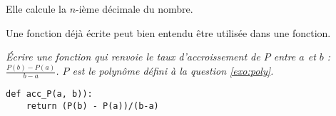 \begin{Answer}
Elle calcule la $n$-ième décimale du nombre.
\end{Answer} 
\medskip
Une fonction déjà écrite peut bien entendu être utilisée dans une fonction. 
\begin{Exercise}[title={Taux d'accroissement}, label = exo:accP]
\it Écrire une fonction  qui renvoie le taux d'accroissement de $P$ entre $a$ et $b$ : $\displaystyle \frac{P(b) -P(a)}{b-a}$. $P$ est le polynôme défini à la question \ref{exo:poly}.
\end{Exercise}
\begin{Answer}
\begin{lstlisting}
def acc_P(a, b)):
    return (P(b) - P(a))/(b-a)
\end{lstlisting}
\end{Answer} 
